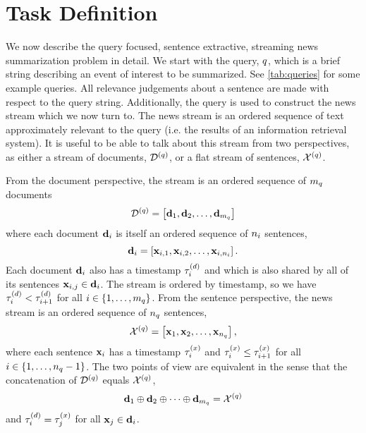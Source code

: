 \section{Task Definition}
\label{sec:strmsumProbDef}

We now describe the query focused, sentence extractive, streaming
news summarization problem in detail. 
We start with the query, $q$, which is a brief string
describing an event of interest to be summarized. See \autoref{tab:queries} for
some example queries. All relevance judgements about a sentence are made with
respect to the query string. Additionally, the query is used to construct the 
news stream which we now turn to. The news stream is an ordered
sequence of text approximately relevant to the query (i.e. the results of 
an information retrieval system). It is useful to be able to talk  
about this stream from 
two perspectives, as either a stream of documents, $\mathcal{D}^{(q)}$, or 
a flat stream of sentences, $\mathcal{X}^{(q)}$.



From the document perspective, the stream is an ordered sequence of
$m_{q}$ documents  \[ \mathcal{D}^{(q)} = \left[ \mathbf{d}_1,
\mathbf{d}_2, \ldots, \mathbf{d}_{m_{q}} \right] \] where each
document $\mathbf{d}_i$ is itself an ordered sequence of $n_i$
sentences, \[ \mathbf{d}_i = \left[ \mathbf{x}_{i,1}, \mathbf{x}_{i,2}, \ldots,
\mathbf{x}_{i,n_i}  \right].  \] Each document $\mathbf{d}_i$ also
has a timestamp $\tau^{(d)}_i$ and which is also shared by all of its
sentences $\mathbf{x}_{i,j}  \in \mathbf{d}_i$.  The stream is ordered by
timestamp, so we have $\tau^{(d)}_i < \tau^{(d)}_{i+1}$ for all $i \in
\{1,\ldots, m_{q}\}$.  From the sentence perspective, the news
stream is an ordered sequence of $n_{q}$ sentences, \[
\mathcal{X}^{(q)} = \left[ \mathbf{x}_1, \mathbf{x}_2, \ldots,
\mathbf{x}_{n_{q}}\right], \] where each sentence $\mathbf{x}_i$
has a timestamp $\tau^{(x)}_i$ and $\tau^{(x)}_i \le
\tau^{(x)}_{i+1}$ for all $i \in \{1,\ldots,n_{q} - 1\}$.
The two points of view are equivalent in the sense that the concatenation of
$\mathcal{D}^{(q)}$ equals $\mathcal{X}^{(q)}$, \[  \mathbf{d}_1 \oplus
\mathbf{d}_2 \oplus \cdots \oplus \mathbf{d}_{m_{q}} =
\mathcal{X}^{(q)} \] and $\tau^{(d)}_i = \tau^{(x)}_j$ for all
$\mathbf{x}_j \in \mathbf{d}_i$.



